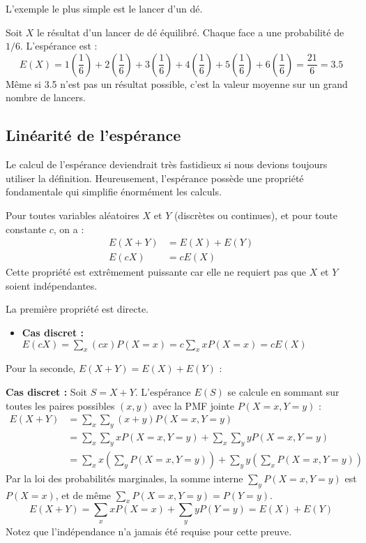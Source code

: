 L'exemple le plus simple est le lancer d'un dé.

\begin{examplebox}[Lancer d'un dé]
Soit $X$ le résultat d'un lancer de dé équilibré. Chaque face a une probabilité de $1/6$. L'espérance est :
$$E(X) = 1\left(\frac{1}{6}\right) + 2\left(\frac{1}{6}\right) + 3\left(\frac{1}{6}\right) + 4\left(\frac{1}{6}\right) + 5\left(\frac{1}{6}\right) + 6\left(\frac{1}{6}\right) = \frac{21}{6} = 3.5$$
Même si 3.5 n'est pas un résultat possible, c'est la valeur moyenne sur un grand nombre de lancers.
\end{examplebox}

\subsection{Linéarité de l'espérance}

Le calcul de l'espérance deviendrait très fastidieux si nous devions toujours utiliser la définition. Heureusement, l'espérance possède une propriété fondamentale qui simplifie énormément les calculs.

\begin{theorembox}
Pour toutes variables aléatoires $X$ et $Y$ (discrètes ou continues), et pour toute constante $c$, on a :
\begin{align*}
E(X+Y) &= E(X) + E(Y) \\
E(cX) &= cE(X)
\end{align*}
Cette propriété est extrêmement puissante car elle ne requiert pas que $X$ et $Y$ soient indépendantes.
\end{theorembox}

\begin{proofbox}
La première propriété est directe.
\begin{itemize}
    \item \textbf{Cas discret :} $E(cX) = \sum_x (cx) P(X=x) = c \sum_x x P(X=x) = cE(X)$
\end{itemize}
Pour la seconde, $E(X+Y) = E(X) + E(Y)$ :

\textbf{Cas discret :} Soit $S = X+Y$. L'espérance $E(S)$ se calcule en sommant sur toutes les paires possibles $(x, y)$ avec la PMF jointe $P(X=x, Y=y)$ :
\begin{align*}
E(X+Y) &= \sum_x \sum_y (x+y) P(X=x, Y=y) \\
&= \sum_x \sum_y x P(X=x, Y=y) + \sum_x \sum_y y P(X=x, Y=y) \\
&= \sum_x x \left( \sum_y P(X=x, Y=y) \right) + \sum_y y \left( \sum_x P(X=x, Y=y) \right)
\end{align*}
Par la loi des probabilités marginales, la somme interne $\sum_y P(X=x, Y=y)$ est $P(X=x)$, et de même $\sum_x P(X=x, Y=y) = P(Y=y)$.
$$E(X+Y) = \sum_x x P(X=x) + \sum_y y P(Y=y) = E(X) + E(Y)$$
Notez que l'indépendance n'a jamais été requise pour cette preuve.
\end{proofbox}

